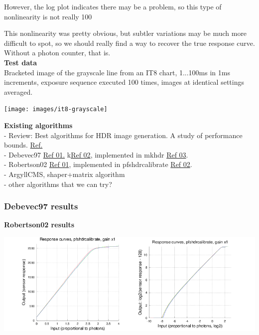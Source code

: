 However, the log plot indicates there may be a problem, so this type of nonlinearity is not really 100%

This nonlinearity was pretty obvious, but subtler variations may be much more difficult to spot, so we should really find a way to recover the true response curve. Without a photon counter, that is. \\

\textbf{Test data}\\

Bracketed image of the grayscale line from an IT8 chart, 1...100ms in 1ms increments, exposure sequence executed 100 times, images at identical settings averaged. 

\begin{center}
\texttt{[image: images/it8-grayscale]}
\end{center}

\textbf{Existing algorithms}\\

- Review: Best algorithms for HDR image generation. A study of performance bounds. \href{https://hal.archives-ouvertes.fr/file/index/docid/733853/filename/best_hdr_algo_hal.pdf}{Ref.}\\
- Debevec97 \href{http://www.pauldebevec.com/Research/HDR/debevec-siggraph97.pdf}{Ref 01.} k\href{http://pages.cs.wisc.edu/~csverma/CS766_09/HDRI/hdr.html}{Ref 02}, implemented in mkhdr \href{http://duikerresearch.com/mkhdr-archive/}{Ref 03}.\\
- Robertson02 \href{http://pages.cs.wisc.edu/~lizhang/courses/cs766-2008f/projects/hdr/Robertson2003ETA.pdf}{Ref 01}, implemented in pfshdrcalibrate \href{http://resources.mpi-inf.mpg.de/hdr/calibration/pfs.html}{Ref 02}.\\
- ArgyllCMS, shaper+matrix algorithm\\
- other algorithms that we can try? \\


\subsubsection{Debevec97 results}

\textbf{Robertson02 results}

\begin{center}
\includegraphics[height=5cm]{images/response-curve-pfs}
\end{center}


